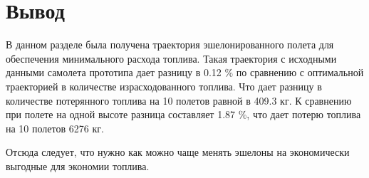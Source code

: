 \section{Вывод}
В данном разделе была получена траектория эшелонированного полета для
обеспечения минимального расхода топлива. Такая траектория с исходными данными 
самолета прототипа дает разницу в 0.12 \% по сравнению с оптимальной траекторией в
количестве израсходованного топлива. Что дает разницу в количестве потерянного
топлива на 10 полетов равной в 409.3 кг. К сравнению при полете на одной высоте
разница составляет 1.87 \%, что дает потерю топлива на 10 полетов 6276 кг.

Отсюда следует, что нужно как можно чаще менять эшелоны на экономически выгодные
для экономии топлива.

